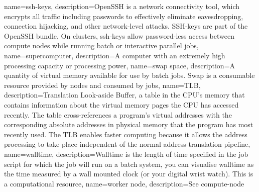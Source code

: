 {
  name={ssh-keys},
  description={OpenSSH is a network connectivity tool, which encrypts all traffic including passwords to effectively eliminate eavesdropping, connection hijacking, and other network-level attacks. SSH-keys are part of the OpenSSH bundle. On \hpc clusters, ssh-keys allow password-less access between compute nodes while running batch or interactive parallel jobs},
}
{
  name={supercomputer},
  description={A computer with an extremely high processing capacity or processing power},
}
{
  name={swap space},
  description={A quantity of virtual memory available for use by batch jobs. Swap is a consumable resource provided by nodes and consumed by jobs},
}
{
  name={TLB},
  description={Translation Look-aside Buffer, a table in the CPU's memory that contains information about the virtual memory pages the CPU has accessed recently. The table cross-references a program's virtual addresses with the corresponding absolute addresses in physical memory that the program has most recently used. The TLB enables faster computing because it allows the address processing to take place independent of the normal address-translation pipeline},
}
{
  name={walltime},
  description={Walltime is the length of time specified in the job script for which the job will run on a batch system, you can visualise walltime as the time measured by a wall mounted clock (or your digital wrist watch). This is a computational resource},
}
{
  name={worker node},
  description={See \gls{compute-node}}
}
